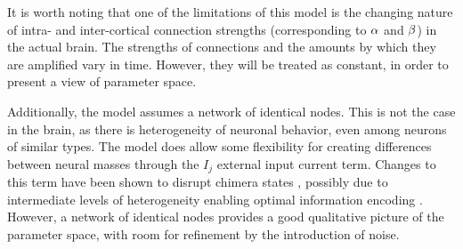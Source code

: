 It is worth noting that one of the limitations of this model is the changing nature of intra- and inter-cortical connection strengths (corresponding to $\alpha$ and $\beta$) in the actual brain.
The strengths of connections and the amounts by which they are amplified vary in time.
However, they will be treated as constant, in order to present a view of parameter space.

Additionally, the model assumes a network of identical nodes.
This is not the case in the brain, as there is heterogeneity of neuronal behavior, even among neurons of similar types.
The model does allow some flexibility for creating differences between neural masses through the $I_{j}$ external input current term.
Changes to this term have been shown to disrupt chimera states \cite{Santos2017}, possibly due to intermediate levels of heterogeneity enabling optimal information encoding \cite{Baroni2014}.
However, a network of identical nodes provides a good qualitative picture of the parameter space, with room for refinement by the introduction of noise.

